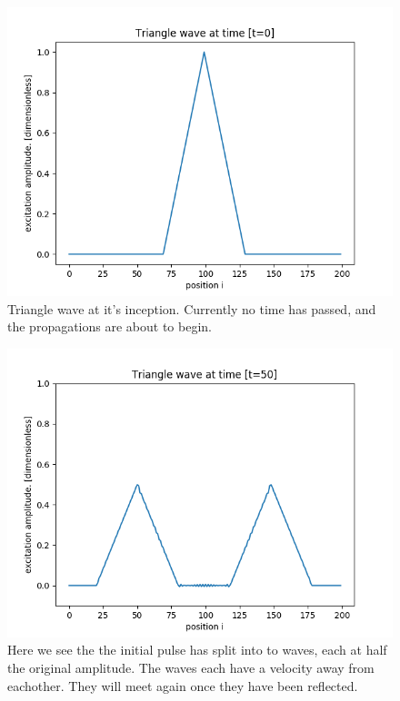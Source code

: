 \documentclass[12pt]{article}
\begin{document}
\begin{figure}[H]
	\includegraphics[scale=0.7]{TriangleWave_t0}
	\caption{Triangle wave at it's inception. Currently no time has passed, and the propagations are about to begin.}
\end{figure}

\begin{figure}[H]
	\includegraphics[scale=0.7]{TriangleWave_t50}
	\caption{Here we see the the initial pulse has split into to waves, each at half the original amplitude. The waves each have a velocity away from eachother. They will meet again once they have been reflected.}
\end{figure}
\end{document}
